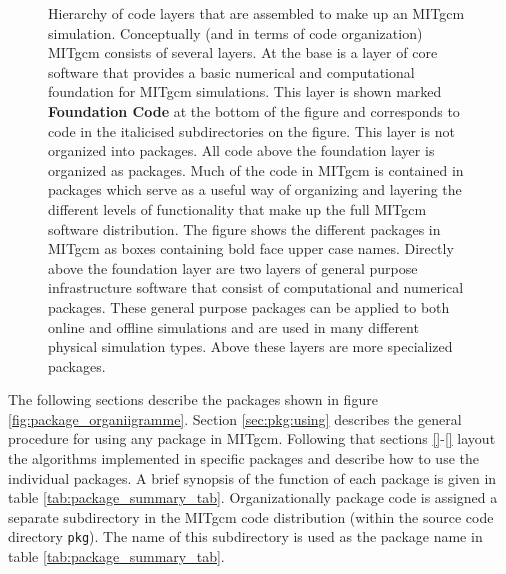\begin{figure}
\label{fig:package_organigramme}
\caption{ Hierarchy of code layers that are assembled to make up an MITgcm 
simulation. Conceptually (and in terms of code organization) MITgcm consists
of several layers. At the base is a layer of core software that provides a 
basic numerical and computational foundation for MITgcm simulations. This 
layer is shown marked {\bf Foundation Code} at the bottom of the figure
and corresponds to code in the italicised subdirectories on the figure.
This layer is not organized into packages. All code above the foundation layer
is organized as packages.  Much of the code in MITgcm is contained in packages 
which serve as a useful way of organizing and layering the different levels of 
functionality that make up the full MITgcm software distribution.
The figure shows the different packages in MITgcm as boxes containing bold 
face upper case names.  Directly above the foundation layer are two layers of 
general purpose infrastructure software that consist of computational and 
numerical packages.  These general purpose packages can be applied to both 
online and offline simulations and are used in many different physical 
simulation types.  Above these layers are more specialized packages.  }
\end{figure}

The following sections describe the packages shown in 
figure \ref{fig:package_organiigramme}. Section \ref{sec:pkg:using}
describes the general procedure for using any package in MITgcm.
Following that sections \ref{}-\ref{} 
layout the algorithms implemented in specific packages
and describe how to use the individual packages. A brief synopsis of the 
function of each package is given in table \ref{tab:package_summary_tab}.
Organizationally package code is assigned a
separate subdirectory in the MITgcm code distribution
(within the source code directory \texttt{pkg}).
The name of this subdirectory is used as the package name in
table \ref{tab:package_summary_tab}.


